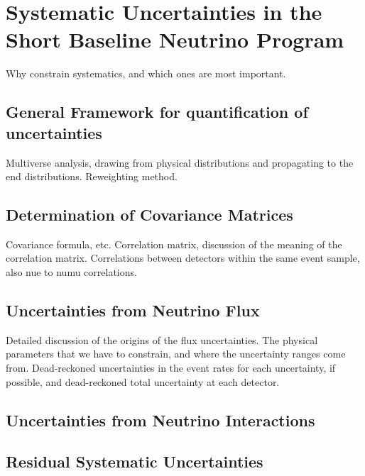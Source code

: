 \chapter{Systematic Uncertainties in the Short Baseline Neutrino Program}

Why constrain systematics, and which ones are most important.  

\section{General Framework for quantification of uncertainties}

Multiverse analysis, drawing from physical distributions and propagating to the end distributions.  Reweighting method.

\section{Determination of Covariance Matrices}

Covariance formula, etc. Correlation matrix, discussion of the meaning of the correlation matrix.  Correlations between detectors within the same event sample, also nue to numu correlations.

\section{Uncertainties from Neutrino Flux}

Detailed discussion of the origins of the flux uncertainties.  The physical parameters that we have to constrain, and where the uncertainty ranges come from.  Dead-reckoned uncertainties in the event rates for each uncertainty, if possible, and dead-reckoned total uncertainty at each detector.

\section{Uncertainties from Neutrino Interactions}

\section{Residual Systematic Uncertainties}